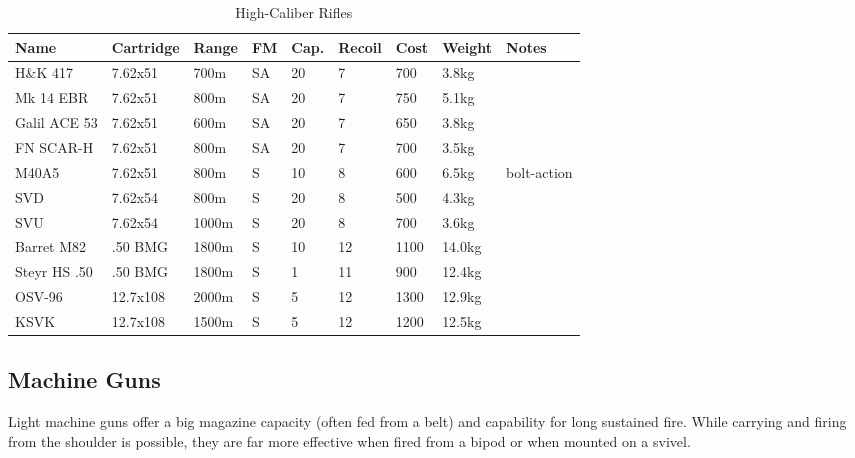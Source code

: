 \begin{table}
  \caption{High-Caliber Rifles}
  \label{tab:Rifles}
  \begin{center}
    \begin{tabular}{| l | l | l | l | l | l | l | l | l |}
      \hline
      \textbf{Name} & \textbf{Cartridge} & \textbf{Range} &
      \textbf{FM} & \textbf{Cap.} & \textbf{Recoil} &
      \textbf{Cost} & \textbf{Weight} & \textbf{Notes} \\ \hline


      H\&K 417      & 7.62x51  &  700m & SA & 20 & 7  &  700 & 3.8kg & \\ \hline
      Mk 14 EBR     & 7.62x51  &  800m & SA & 20 & 7  &  750 & 5.1kg & \\ \hline
      Galil ACE 53  & 7.62x51  &  600m & SA & 20 & 7  &  650 & 3.8kg & \\ \hline
      FN SCAR-H     & 7.62x51  &  800m & SA & 20 & 7  &  700 & 3.5kg & \\ \hline
      M40A5         & 7.62x51  &  800m & S  & 10 & 8  &  600 & 6.5kg & bolt-action \\ \hline

      SVD           & 7.62x54  &  800m & S  & 20 & 8  &  500 & 4.3kg & \\ \hline
      SVU           & 7.62x54  & 1000m & S  & 20 & 8  &  700 & 3.6kg & \\ \hline

      Barret M82    & .50 BMG  & 1800m & S  & 10 & 12 & 1100 & 14.0kg \\ \hline
      Steyr HS .50  & .50 BMG  & 1800m & S  &  1 & 11 &  900 & 12.4kg \\ \hline

      OSV-96        & 12.7x108 & 2000m & S  &  5 & 12 & 1300 & 12.9kg \\ \hline
      KSVK          & 12.7x108 & 1500m & S  &  5 & 12 & 1200 & 12.5kg \\ \hline
    \end{tabular}
  \end{center}
\end{table}


\subsection{Machine Guns}

Light machine guns offer a big magazine capacity (often fed from a belt) and
capability for long sustained fire. While carrying and firing from the shoulder
is possible, they are far more effective when fired from a bipod or when mounted
on a svivel.

